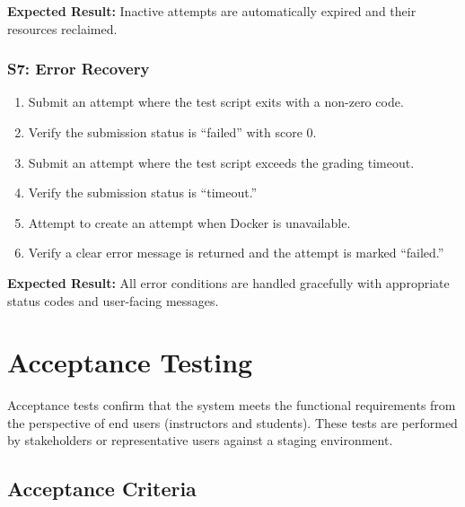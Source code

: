 \documentclass[12pt, letterpaper]{article}
\begin{document}
\textbf{Expected Result:} Inactive attempts are automatically expired and their resources reclaimed.

\subsubsection{S7: Error Recovery}

\begin{enumerate}
    \item Submit an attempt where the test script exits with a non-zero code.
    \item Verify the submission status is ``failed'' with score 0.
    \item Submit an attempt where the test script exceeds the grading timeout.
    \item Verify the submission status is ``timeout.''
    \item Attempt to create an attempt when Docker is unavailable.
    \item Verify a clear error message is returned and the attempt is marked ``failed.''
\end{enumerate}

\textbf{Expected Result:} All error conditions are handled gracefully with appropriate status codes and user-facing messages.

\section{Acceptance Testing}

Acceptance tests confirm that the system meets the functional requirements from the perspective of end users (instructors and students). These tests are performed by stakeholders or representative users against a staging environment.

\subsection{Acceptance Criteria}
\end{document}
